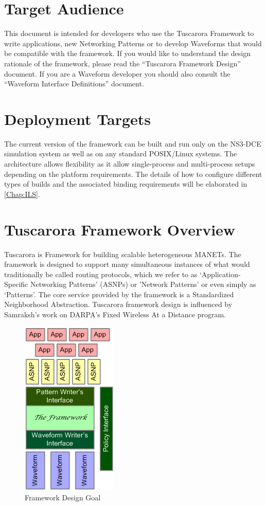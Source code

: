 \section{Target Audience}
This document is intended for developers who use the
Tuscarora Framework to write applications, new Networking Patterns or to develop
Waveforms that would be compatible with the framework. If you would
like to understand the design rationale of the framework, please read
the ``Tuscarora Framework Design'' document. If you are a Waveform
developer you should also consult the ``Waveform Interface
Definitions'' document.

\section{Deployment Targets}

The current version of the framework can be built and run only on the
NS3-DCE simulation system as well as on any standard POSIX/Linux systems. 
The architecture allows flexibility as it allow single-process and multi-process setups depending on the platform requirements. 
The details of  how to configure different types of builds and the associated binding requirements will be elaborated in \cref{Chap:ILS}.

\section{Tuscarora Framework Overview}

Tuscarora is Framework for building scalable heterogeneous MANETs. The
framework is designed to support many simultaneous instances of what would
traditionally be called routing protocols, which we refer
to as `Application-Specific Networking Patterns' (ASNPs) or 'Network Patterns' or even simply as `Patterns'. The core service provided by the framework is a
Standardized Neighborhood Abstraction. Tuscarora framework design is influenced by Samraksh's work on DARPA's Fixed Wireless At a Distance program. 

\begin{figure}[ht]
 \centering
 \includegraphics{figures/ASNPContext}
 \caption{Framework Design Goal}
 \label{Fig:Goal}
\end{figure}

